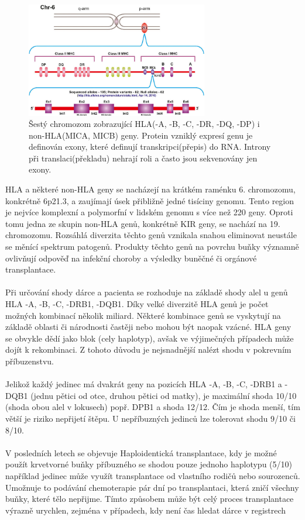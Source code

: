 \documentclass[czech,DP]{thesiskiv}
\numberwithin{equation}{section}
\begin{document}
\begin{figure}[H]		
		\centering
		\includegraphics[width=300px]{./img/genom6_mica.jpg}
		\caption{Šestý chromozom zobrazující HLA(-A, -B, -C, -DR, -DQ, -DP) i non-HLA(MICA, MICB) geny. Protein vzniklý expresí genu je definován exony, které definují transkripci(přepis) do RNA. Introny při translaci(překladu) nehrají roli a často jsou sekvenovány jen exony. \cite{chromozome6_mica} 
		}
		\label{fig:hla_genome}
\end{figure}

\noindent
HLA a některé non-HLA geny se nacházejí na krátkém raménku 6. chromozomu, konkrétně 6p21.3, a zaujímají úsek přibližně jedné tisíciny genomu. Tento region je nejvíce komplexní a polymorfní v lidském genomu s více než 220 geny. Oproti tomu jedna ze skupin non-HLA genů, konkrétně KIR geny, se nachází na 19. chromozomu. Rozsáhlá diverzita těchto genů vznikala snahou eliminovat neustále se měnící spektrum patogenů. Produkty těchto genů na povrchu buňky významně ovlivňují odpověď na infekční choroby a výsledky buněčné či orgánové transplantace. \cite{imgt_hla_database}
\\
\\
Při určování shody dárce a pacienta se rozhoduje na základě shody alel u genů HLA -A, -B, -C, -DRB1, -DQB1. Díky velké diverzitě HLA genů je počet možných kombinací několik miliard. Některé kombinace genů se vyskytují na základě oblasti či národnosti častěji nebo mohou být naopak vzácné. HLA geny se obvykle dědí jako blok (cely haplotyp), avšak ve výjimečných případech může dojít k rekombinaci. Z tohoto důvodu je nejsnadnější nalézt shodu v pokrevním příbuzenstvu.
\\
\\
Jelikož každý jedinec má dvakrát geny na pozicích HLA -A, -B, -C, -DRB1 a -DQB1 (jednu pětici od otce, druhou pětici od matky), je maximální shoda 10/10 (shoda obou alel v lokusech) popř. DPB1 a shoda 12/12. Čím je shoda menší, tím větší je riziko nepřijetí štěpu. U nepříbuzných jedinců lze tolerovat shodu 9/10 či 8/10. \cite{Frycova_bakalarka} \cite{KIR_transplantace_jindra}
\\
\\
V posledních letech se objevuje Haploidentická transplantace, kdy je možné použít krvetvorné buňky příbuzného se shodou pouze jednoho haplotypu (5/10) například jedinec může využít transplantace od vlastního rodičů nebo sourozenců. Umožnuje to podávání chemoterapie pár dní po transplantaci, která zničí všechny buňky, které tělo nepřijme. Tímto způsobem může být celý proces transplantace výrazně urychlen, zejména v případech, kdy není čas hledat dárce v registrech \cite{haploidenticka_transplantace}
\end{document}
